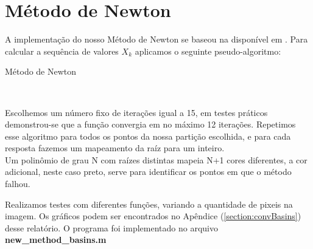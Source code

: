 
\chapter{Método de Newton}\label{partes:newtonMethod}

  A implementação do nosso Método de Newton se baseou na disponível em \cite{numericalMethods}. Para calcular a sequência de valores $X_k$ aplicamos o seguinte pseudo-algoritmo:

  \begin{algorithm}
    \caption{Método de Newton}\label{euclid}
    \begin{algorithmic}[1]
        \Else
          \\
          \EndIf
        \EndIf
      \EndWhile
    \EndProcedure
    \end{algorithmic}
  \end{algorithm}

  Escolhemos um número fixo de iterações igual a 15, em testes práticos demonstrou-se que a função convergia em no máximo 12 iterações. Repetimos esse algoritmo para todos os pontos da nossa partição escolhida, e para cada resposta fazemos um mapeamento da raíz para um inteiro. \\

  Um polinômio de grau N com raízes distintas mapeia N+1 cores diferentes, a cor adicional, neste caso preto, serve para identificar os pontos em que o método falhou.

  Realizamos testes com diferentes funções, variando a quantidade de pixeis na imagem. Os gráficos podem ser encontrados no Apêndice (\ref{section:convBasins}) desse relatório. O programa foi implementado no arquivo \textbf{new\_method\_basins.m}

